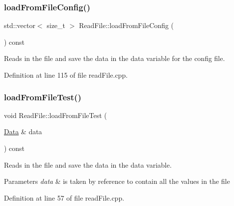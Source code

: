 \mbox{\label{class_read_file_acae54464293fba0c2f0adcd9d878a176}} 
\subsubsection{\texorpdfstring{load\+From\+File\+Config()}{loadFromFileConfig()}}
{\footnotesize\ttfamily std\+::vector$<$ size\+\_\+t $>$ Read\+File\+::load\+From\+File\+Config (\begin{DoxyParamCaption}{ }\end{DoxyParamCaption}) const}



Reads in the file and save the data in the data variable for the config file. 



Definition at line 115 of file read\+File.\+cpp.

\mbox{\label{class_read_file_ac629f612ecfb04a6ef4414d5feb995bd}} 
\subsubsection{\texorpdfstring{load\+From\+File\+Test()}{loadFromFileTest()}}
{\footnotesize\ttfamily void Read\+File\+::load\+From\+File\+Test (\begin{DoxyParamCaption}\item[{\mbox{\hyperlink{struct_data}{Data}} \&}]{data }\end{DoxyParamCaption}) const}



Reads in the file and save the data in the data variable. 


\begin{DoxyParams}{Parameters}
{\em data} & is taken by reference to contain all the values in the file \\
\hline
\end{DoxyParams}


Definition at line 57 of file read\+File.\+cpp.

\mbox{\label{class_read_file_a0ac546e0980ee76612480df922728880}} 
